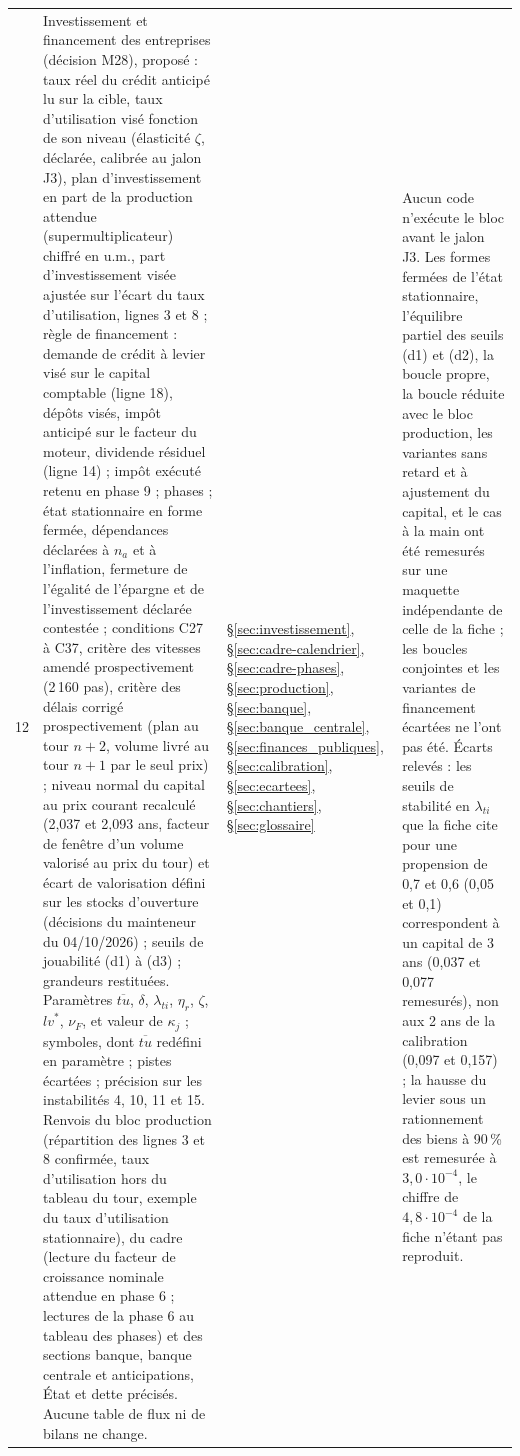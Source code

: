 \documentclass[11pt,a4paper]{article}
\begin{document}
\begin{center}
\begin{longtable}{p{0.5cm}>{\raggedright\arraybackslash}p{6.3cm}>{\raggedright\arraybackslash}p{2.1cm}>{\raggedright\arraybackslash}p{5.8cm}}
12 & Investissement et financement des entreprises (décision M28), proposé : taux réel du crédit anticipé lu sur la cible, taux d'utilisation visé fonction de son niveau (élasticité $\zeta$, déclarée, calibrée au jalon J3), plan d'investissement en part de la production attendue (supermultiplicateur) chiffré en u.m., part d'investissement visée ajustée sur l'écart du taux d'utilisation, lignes 3 et 8 ; règle de financement : demande de crédit à levier visé sur le capital comptable (ligne 18), dépôts visés, impôt anticipé sur le facteur du moteur, dividende résiduel (ligne 14) ; impôt exécuté retenu en phase 9 ; phases ; état stationnaire en forme fermée, dépendances déclarées à $n_a$ et à l'inflation, fermeture de l'égalité de l'épargne et de l'investissement déclarée contestée ; conditions C27 à C37, critère des vitesses amendé prospectivement (2\,160 pas), critère des délais corrigé prospectivement (plan au tour $n + 2$, volume livré au tour $n + 1$ par le seul prix) ; niveau normal du capital au prix courant recalculé (2,037 et 2,093 ans, facteur de fenêtre d'un volume valorisé au prix du tour) et écart de valorisation défini sur les stocks d'ouverture (décisions du mainteneur du 04/10/2026) ; seuils de jouabilité (d1) à (d3) ; grandeurs restituées. Paramètres $\overline{\mathit{tu}}$, $\delta$, $\lambda_{\mathit{ti}}$, $\eta_r$, $\zeta$, $\mathit{lv}^\ast$, $\nu_F$, et valeur de $\kappa_j$ ; symboles, dont $\overline{\mathit{tu}}$ redéfini en paramètre ; pistes écartées ; précision sur les instabilités 4, 10, 11 et 15. Renvois du bloc production (répartition des lignes 3 et 8 confirmée, taux d'utilisation hors du tableau du tour, exemple du taux d'utilisation stationnaire), du cadre (lecture du facteur de croissance nominale attendue en phase 6 ; lectures de la phase 6 au tableau des phases) et des sections banque, banque centrale et anticipations, État et dette précisés. Aucune table de flux ni de bilans ne change. & \S\ref{sec:investissement}, \S\ref{sec:cadre-calendrier}, \S\ref{sec:cadre-phases}, \S\ref{sec:production}, \S\ref{sec:banque}, \S\ref{sec:banque_centrale}, \S\ref{sec:finances_publiques}, \S\ref{sec:calibration}, \S\ref{sec:ecartees}, \S\ref{sec:chantiers}, \S\ref{sec:glossaire} & Aucun code n'exécute le bloc avant le jalon J3. Les formes fermées de l'état stationnaire, l'équilibre partiel des seuils (d1) et (d2), la boucle propre, la boucle réduite avec le bloc production, les variantes sans retard et à ajustement du capital, et le cas à la main ont été remesurés sur une maquette indépendante de celle de la fiche ; les boucles conjointes et les variantes de financement écartées ne l'ont pas été. Écarts relevés : les seuils de stabilité en $\lambda_{\mathit{ti}}$ que la fiche cite pour une propension de 0,7 et 0,6 (0,05 et 0,1) correspondent à un capital de 3 ans (0,037 et 0,077 remesurés), non aux 2 ans de la calibration (0,097 et 0,157) ; la hausse du levier sous un rationnement des biens à 90\,\% est remesurée à $3{,}0 \cdot 10^{-4}$, le chiffre de $4{,}8 \cdot 10^{-4}$ de la fiche n'étant pas reproduit.\\

\end{longtable}
\end{center}
\end{document}
